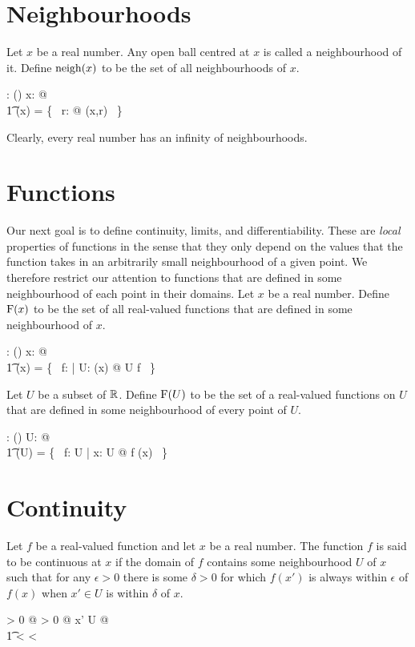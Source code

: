 \documentclass[11pt, oneside]{article}
\begin{document}
\section{Neighbourhoods}

Let $x$ be a real number.
Any open ball centred at $x$ is called a neighbourhood of it.
Define $\operatorname{neigh}(x)$ to be the set of all neighbourhoods of $x$.

\begin{axdef}
	\neighR: \R \fun \power (\power \R)
\where
	\forall x: \R @ \\
	\t1	\neighR(x) = \{~ r: \Rpos @ \ballRR(x,r) ~\}
\end{axdef}
Clearly, every real number has an infinity of neighbourhoods.

\section{Functions}

Our next goal is to define continuity, limits, and differentiability.
These are {\it local} properties of functions
in the sense that they only depend on the values that the function takes in an arbitrarily small neighbourhood of a given point.
We therefore restrict our attention to functions that are defined in some neighbourhood of each point in their domains.
Let $x$ be a real number. 
Define $\operatorname{F}(x)$ to be the set of all real-valued functions that are defined in some neighbourhood of $x$.
\begin{axdef}
	\FunR: \R \fun \power(\R \pfun \R)
\where
	\forall x: \R @ \\
	\t1	\FunR(x) = \{~ f: \R \pfun \R | \exists U: \neighR(x) @ U \subseteq \dom f ~\}
\end{axdef}

Let $U$ be a subset of $\mathbb{R}$.
Define $\operatorname{F}(U)$ to be the set of a real-valued functions on $U$ that are defined in some neighbourhood of every point of $U$.
\begin{axdef}
	\FunPR: \power \R \fun \power (\R \pfun \R)
\where
	\forall U: \power \R @ \\
	\t1	\FunPR(U) = \{~ f: U \fun \R | \forall x: U @ f \in \FunR(x) ~\}
\end{axdef}

\section{Continuity}

Let $f$ be a real-valued function and 
let $x$ be a real number.
The function $f$ is said to be continuous at $x$ if 
the domain of $f$ contains some neighbourhood $U$ of $x$ such that
for any $\epsilon > 0$ there is some $\delta > 0$ for which 
$f(x')$ is always within $\epsilon$ of $f(x)$
when $x' \in U$ is within $\delta$ of $x$.
\begin{argue}
\forall \epsilon > 0 @ \exists \delta > 0 @ \forall x' \in U @ \\
\t1	 < \delta \implies {} < \epsilon
\end{argue}
\end{document}
